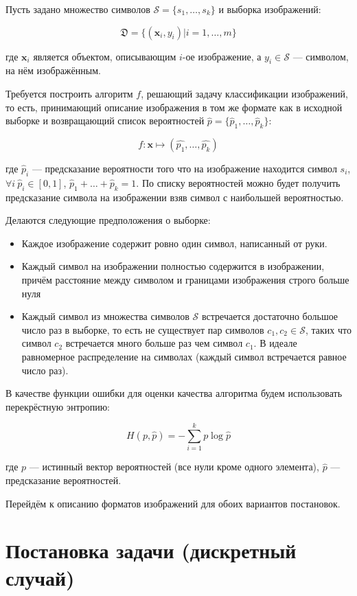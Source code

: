\documentclass[12pt,twoside]{article}
\newcommand{\x}{\mathbf{x}}
\begin{document}
	Пусть задано множество символов $\mathcal{S}=\{s_1,\ldots,s_k\}$ и выборка изображений:
	
	$$\mathfrak{D}=\{(\x_i,y_i)|i=1,\ldots,m\}$$
	
	где $\x_i$ является объектом, описывающим $i$-ое изображение, а $y_i \in \mathcal{S}$ --- символом, на нём изображённым. 
	
	Требуется построить алгоритм $f$, решающий задачу классификации изображений, то есть, принимающий описание изображения в том же формате как в исходной выборке и возвращающий список вероятностей $\hat{p}=\{\hat{p}_1,\ldots,\hat{p}_k\}$:
	
	$$f: \x \mapsto (\hat{p_1},\ldots,\hat{p_k})$$
	
	где $\hat{p}_i$ --- предсказание вероятности того что на изображение находится символ $s_i$, $\forall i\ \hat{p}_i \in [0, 1]$, $\hat{p}_1+\ldots+\hat{p}_k=1$. По списку вероятностей можно будет получить предсказание символа на изображении взяв символ с наибольшей вероятностью.
	
	Делаются следующие предположения о выборке:
	
	\begin{itemize}
		\item Каждое изображение содержит ровно один символ, написанный от руки.
		\item Каждый символ на изображении полностью содержится в изображении, причём расстояние между символом и границами изображения строго больше нуля
		\item Каждый символ из множества символов $\mathcal{S}$ встречается достаточно большое число раз в выборке, то есть не существует пар символов $c_1, c_2 \in \mathcal{S}$, таких что символ $c_2$ встречается много больше раз чем символ $c_1$. В идеале равномерное распределение на символах (каждый символ встречается равное число раз).
	\end{itemize}
	
	В качестве функции ошибки для оценки качества алгоритма будем использовать перекрёстную энтропию:
	
	$$H(p, \hat{p}) = -\sum_{i=1}^k p\log{\hat{p}}$$
	
	где $p$ --- истинный вектор вероятностей (все нули кроме одного элемента), $\hat{p}$ --- предсказание вероятностей.
	
	Перейдём к описанию форматов изображений для обоих вариантов постановок.
	
	\section{Постановка задачи (дискретный случай)}
	
\end{document}
